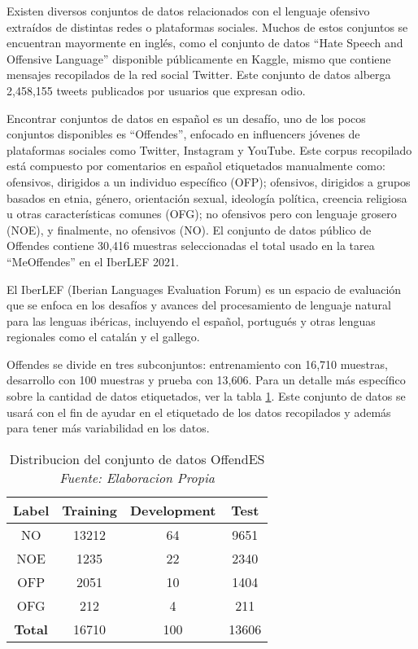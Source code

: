 Existen diversos conjuntos de datos relacionados con el lenguaje ofensivo extraídos de distintas redes o plataformas sociales. Muchos de estos conjuntos se encuentran mayormente en inglés, como el conjunto de datos ``Hate Speech and Offensive Language'' disponible públicamente en Kaggle, mismo que contiene mensajes recopilados de la red social Twitter. Este conjunto de datos alberga 2,458,155 tweets publicados por usuarios que expresan odio.

Encontrar conjuntos de datos en español es un desafío, uno de los pocos conjuntos disponibles es ``Offendes'', enfocado en influencers jóvenes de plataformas sociales como Twitter, Instagram y YouTube. Este corpus recopilado está compuesto por comentarios en español etiquetados manualmente como: ofensivos, dirigidos a un individuo específico (OFP); ofensivos, dirigidos a grupos basados en etnia, género, orientación sexual, ideología política, creencia religiosa u otras características comunes (OFG); no ofensivos pero con lenguaje grosero (NOE), y finalmente, no ofensivos (NO). El conjunto de datos público de Offendes contiene 30,416 muestras seleccionadas el total usado en la tarea ``MeOffendes'' en el IberLEF 2021. 

El IberLEF (Iberian Languages Evaluation Forum) es un espacio de evaluación que se enfoca en los desafíos y avances del procesamiento de lenguaje natural para las lenguas ibéricas, incluyendo el español, portugués y otras lenguas regionales como el catalán y el gallego.

Offendes se divide en tres subconjuntos: entrenamiento con 16,710 muestras, desarrollo con 100 muestras y prueba con 13,606. Para un detalle más específico sobre la cantidad de datos etiquetados, ver la tabla \ref{tbl:13}. Este conjunto de datos se usará con el fin de ayudar en el etiquetado de los datos recopilados y además para tener más variabilidad en los datos.

\begin{table}[!ht]
	\centering
	\begin{tabular}{|c|c|c|c|}
		\hline
		\textbf{Label} & \textbf{Training} & \textbf{Development} & \textbf{Test} \\ \hline
		NO & 13212 & 64 & 9651 \\ 
		NOE & 1235 & 22 & 2340 \\ 
		OFP & 2051 & 10 & 1404 \\ 
		OFG & 212 & 4 & 211 \\ \hline
		\textbf{Total} & 16710 & 100 & 13606 \\ \hline
	\end{tabular}
	\caption{Distribucion del conjunto de datos OffendES
		\\\textit{Fuente: Elaboracion Propia}}
	\label{tbl:13}
\end{table}

